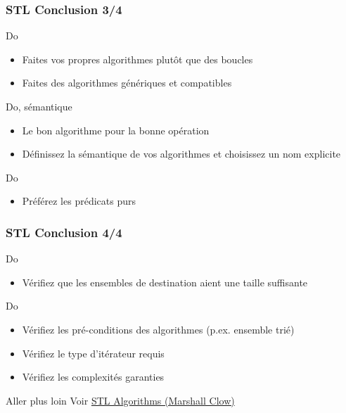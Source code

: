 \documentclass[C++.tex]{subfiles}
\begin{document}
\begin{frame}
	\frametitle{STL Conclusion \titlehfill{}3/4}
	\begin{exampleblock}{Do}
		\begin{itemize}
			\item Faites vos propres algorithmes plutôt que des boucles
			\item Faites des algorithmes génériques et compatibles
		\end{itemize}
	\end{exampleblock}

	\begin{exampleblock}{Do, sémantique}
		\begin{itemize}
			\item Le bon algorithme pour la bonne opération
			\item Définissez la sémantique de vos algorithmes et choisissez un nom explicite
		\end{itemize}
	\end{exampleblock}

	\begin{exampleblock}{Do}
		\begin{itemize}
			\item Préférez les prédicats \og purs\fg{}
		\end{itemize}
	\end{exampleblock}
\end{frame}

\begin{frame}
	\frametitle{STL Conclusion \titlehfill{}4/4}
	\begin{exampleblock}{Do}
		\begin{itemize}
			\item Vérifiez que les ensembles de destination aient une taille suffisante
		\end{itemize}
	\end{exampleblock}

	\begin{exampleblock}{Do}
		\begin{itemize}
			\item Vérifiez les pré-conditions des algorithmes (p.ex. ensemble trié)
			\item Vérifiez le type d'itérateur requis
			\item Vérifiez les complexités garanties
		\end{itemize}
	\end{exampleblock}

	\begin{block}{Aller plus loin}
		Voir \href{https://github.com/CppCon/CppCon2016/blob/master/Presentations/STL\%20Algorithms/STL\%20Algorithms\%20-\%20Marshall\%20Clow\%20-\%20CppCon\%202016.pdf}{STL Algorithms (Marshall Clow)}

	\end{block}
\end{frame}
\end{document}
